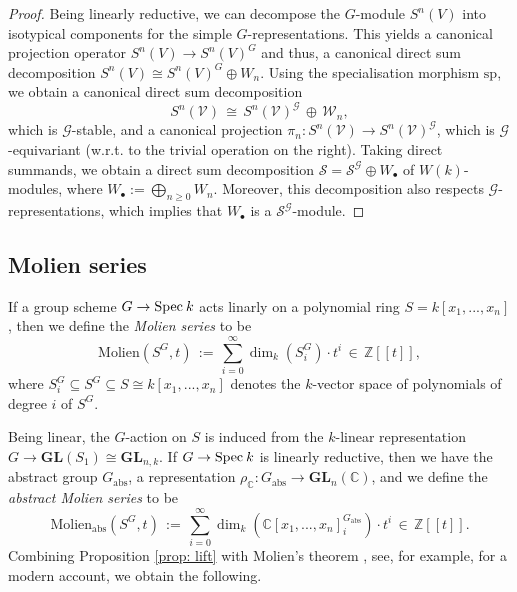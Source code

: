 \documentclass[reqno]{amsart}
\newcommand{\ZZ}{{\mathbb{Z}}}
\newcommand{\CC}{{\mathbb{C}}}
\newcommand{\Spec}{{\rm Spec}\:}
\newcommand{\GL}{{\mathbf{GL}}}
\theoremstyle{definition}
\theoremstyle{plain}
\begin{document}
\begin{proof}
Being linearly reductive, we can decompose the $G$-module
$S^n(V)$ into isotypical components for the simple $G$-representations.
This yields a canonical projection operator $S^n(V)\to S^n(V)^G$
and thus, a canonical direct sum decomposition 
$S^n(V)\cong S^n(V)^G\oplus W_n$.
Using the specialisation morphism $\mathrm{sp}$, we obtain a 
canonical direct sum decomposition
$$
S^n(\mathcal{V}) \,\cong\, S^n(\mathcal{V})^{\mathcal{G}}\,\oplus\,\mathcal{W}_n,
$$
which is $\mathcal{G}$-stable,
and a canonical projection $\pi_n:S^n(\mathcal{V})\to S^n(\mathcal{V})^{\mathcal{G}}$,
which is $\mathcal{G}$-equivariant (w.r.t. to the trivial operation on the right).
Taking direct summands, we obtain a direct sum decomposition
$\mathcal{S}=\mathcal{S}^{\mathcal{G}}\oplus W_\bullet$ of $W(k)$-modules, 
where $W_\bullet:=\bigoplus_{n\geq0} W_n$.
Moreover, this decomposition also respects
$\mathcal{G}$-representations, which implies
that $W_\bullet$ is a $\mathcal{S}^{\mathcal{G}}$-module.
\end{proof}

\subsection{Molien series}
If a group scheme $G\to\Spec k$ acts linarly 
on a polynomial ring $S=k[x_1,...,x_n]$,
then we define the \emph{Molien series} to be
$$
 \mathrm{Molien}(S^G,t) \,:=\,
 \sum_{i=0}^\infty  \dim_k(S^G_i)\cdot t^i \,\in\, \ZZ[[t]],
$$
where $S^G_i\subseteq S^G\subseteq S\cong k[x_1,...,x_n]$ 
denotes the $k$-vector space of polynomials of degree $i$ 
of $S^G$.

Being linear, the $G$-action on $S$ is induced from the $k$-linear
representation $G\to\GL(S_1)\cong\GL_{n,k}$.
If $G\to\Spec k$ is linearly reductive, then we have 
the abstract group $G_{\mathrm{abs}}$, 
a representation $\rho_\CC:G_{\mathrm{abs}}\to\GL_n(\CC)$,
and we define the \emph{abstract Molien series} to be
$$
 \mathrm{Molien}_{\mathrm{abs}}(S^G,t) \,:=\,
 \sum_{i=0}^\infty  \dim_k(\CC[x_1,...,x_n]^{G_{\mathrm{abs}}}_i)\cdot t^i \,\in\, \ZZ[[t]].
$$
Combining Proposition \ref{prop: lift} with Molien's
theorem \cite{Molien}, see, for example, \cite[Section 3.4]{DK} for a modern account, 
we obtain the following.
\end{document}
